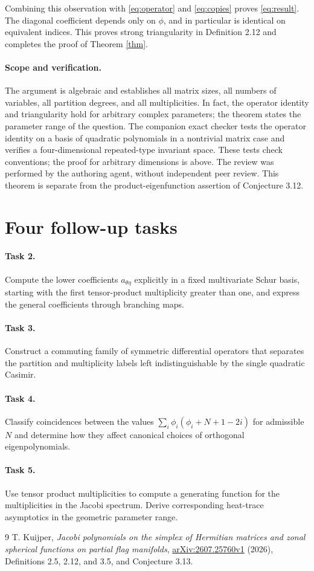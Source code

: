 \documentclass[11pt]{article}
\begin{document}
Combining this observation with \eqref{eq:operator} and
\eqref{eq:copies} proves \eqref{eq:result}. The diagonal coefficient
depends only on $\phi$, and in particular is identical on equivalent
indices. This proves strong triangularity in Definition 2.12 and
completes the proof of Theorem \ref{thm}.

\paragraph{Scope and verification.}
The argument is algebraic and establishes all matrix sizes, all numbers
of variables, all partition degrees, and all multiplicities. In fact,
the operator identity and triangularity hold for arbitrary complex
parameters; the theorem states the parameter range of the question.
The companion exact checker tests the operator identity on a basis of
quadratic polynomials in a nontrivial matrix case and verifies a
four-dimensional repeated-type invariant space. These tests check
conventions; the proof for arbitrary dimensions is above.
The review was performed by the authoring agent, without independent
peer review. This theorem is separate from the product-eigenfunction
assertion of Conjecture 3.12.

\section*{Four follow-up tasks}
\paragraph{Task 2.}
Compute the lower coefficients $a_{\theta\eta}$ explicitly in a fixed
multivariate Schur basis, starting with the first tensor-product
multiplicity greater than one, and express the general coefficients
through branching maps.
\paragraph{Task 3.}
Construct a commuting family of symmetric differential operators that
separates the partition and multiplicity labels left indistinguishable
by the single quadratic Casimir.
\paragraph{Task 4.}
Classify coincidences between the values
$\sum_i\phi_i(\phi_i+N+1-2i)$ for admissible $N$ and determine how they
affect canonical choices of orthogonal eigenpolynomials.
\paragraph{Task 5.}
Use tensor product multiplicities to compute a generating function for
the multiplicities in the Jacobi spectrum. Derive corresponding
heat-trace asymptotics in the geometric parameter range.

\begin{thebibliography}{9}
 T. Kuijper, \emph{Jacobi polynomials on the simplex of Hermitian
matrices and zonal spherical functions on partial flag manifolds},
\href{https://arxiv.org/abs/2607.25760v1}{arXiv:2607.25760v1} (2026),
Definitions 2.5, 2.12, and 3.5, and Conjecture 3.13.
\end{thebibliography}
\end{document}
